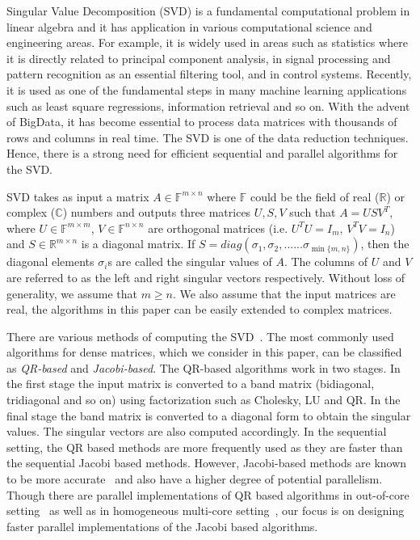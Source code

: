 \documentclass[10pt, conference, compsocconf]{IEEEtran}
\begin{document}
Singular Value Decomposition (SVD) is a fundamental computational problem in linear algebra and it has application in various computational science and engineering areas. For example, it is widely used in areas such as statistics where it is directly related to principal component analysis, in signal processing and pattern recognition as an essential filtering tool, and in control systems. Recently, it is used as one of the fundamental steps in many machine learning applications such as least square regressions, information retrieval and so on. With the advent of BigData, it has become essential to process data matrices with thousands of rows and columns in real time. The SVD is one of the data reduction techniques. Hence, there is a strong need for efficient sequential and parallel algorithms for the SVD.

SVD takes as input a matrix $A \in \mathbb{F}^{m \times n}$ where $\mathbb{F}$ could be the field of real ($\mathbb{R}$) or complex ($\mathbb{C}$) numbers and outputs three matrices $U, S, V$ such that $A = USV^T$, where $U \in \mathbb{F}^{m \times m}$, $V \in \mathbb{F}^{n \times n}$ are orthogonal matrices (i.e. $U^TU = I_m$, $V^TV = I_n$) and $S \in \mathbb{R}^{m \times n}$ is a diagonal matrix. If $S = diag(\sigma_1, \sigma_2,......\sigma_{\min\{m,n\}})$, then the diagonal elements $\sigma_i$s are called the singular values of $A$. The columns of $U$ and $V$ are referred to as the left and right singular vectors respectively. Without loss of generality, we assume that $m \ge n$. We also assume that the input matrices are real, the algorithms in this paper can be easily extended to complex matrices. 

There are various methods of computing the SVD~\cite{golub2012matrix}. The most commonly used algorithms for dense matrices, which we consider in this paper, can be classified as \emph{QR-based} and \emph{Jacobi-based}. The QR-based algorithms work in two stages. In the first stage the input matrix is converted to a band matrix (bidiagonal, tridiagonal and so on) using factorization such as Cholesky, LU and QR. In the final stage the band matrix is converted to a diagonal form to obtain the singular values. The singular vectors are also computed accordingly. In the sequential setting, the QR based methods are more frequently used as they are faster than the sequential Jacobi based methods. However, Jacobi-based methods are known to be more accurate~\cite{demmel1992jacobi} and also have a higher degree of potential parallelism. Though there are parallel implementations of QR based algorithms in out-of-core setting~\cite{grimes1987solution, grimes1988solution} as well as in homogeneous multi-core setting~\cite{haidar2013improved}, our focus is on designing faster parallel implementations of the Jacobi based algorithms.
\end{document}
